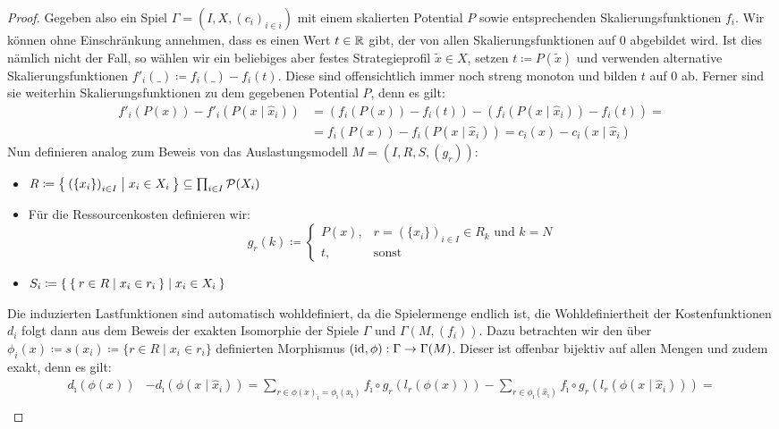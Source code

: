 \begin{proof}
	Gegeben also ein Spiel $\Gamma = (I, X, (c_i)_{i\in i})$ mit einem skalierten Potential $P$ sowie entsprechenden Skalierungsfunktionen $f_i$. Wir können ohne Einschränkung annehmen, dass es einen Wert $t \in \mathbb{R}$ gibt, der von allen Skalierungsfunktionen auf $0$ abgebildet wird. Ist dies nämlich nicht der Fall, so wählen wir ein beliebiges aber festes Strategieprofil $\widetilde{x} \in X$, setzen $t \coloneqq P(\widetilde{x})$ und verwenden alternative Skalierungsfunktionen $f'_i(\_) \coloneqq f_i(\_) - f_i(t)$. Diese sind offensichtlich immer noch streng monoton und bilden $t$ auf $0$ ab. Ferner sind sie weiterhin Skalierungsfunktionen zu dem gegebenen Potential $P$, denn es gilt:
		\begin{align*}
			f'_i(P(x)) - f'_i(P(x\mid \hat{x}_i)) 	&= \left(f_i(P(x)) - f_i(t)\right) - \left(f_i(P(x \mid \hat{x}_i)) - f_i(t)\right) = \\
													&= f_i(P(x)) - f_i(P(x\mid \hat{x}_i)) = c_i(x) - c_i(x \mid \hat{x}_i)
		\end{align*}
	Nun definieren analog zum Beweis von  das Auslastungsmodell $M = (I, R, S, (g_r))$:
	\begin{itemize}
		\item $R \coloneqq \Set{\left(\{x_i\}\right)_{i \in I} | x_i \in X_i } \subseteq \prod_{i \in I}\mathcal{P}(X_i)$
		\item Für die Ressourcenkosten definieren wir:
			\[g_r(k) \coloneqq 
				\begin{cases}
					P(x), 					&r = \left(\{x_i\}\right)_{i \in I} \in R_k 													\text{ und } k=N \\
					t,						&\text{sonst}
				\end{cases}\]
		\item $S_i \coloneqq \Set{ \Set{r \in R | x_i \in r_i} | x_i \in X_i }$
	\end{itemize}
	Die induzierten Lastfunktionen sind automatisch wohldefiniert, da die Spielermenge endlich ist, die Wohldefiniertheit der Kostenfunktionen $d_i$ folgt dann aus dem Beweis der exakten Isomorphie der Spiele $\Gamma$ und $\Gamma(M, (f_i))$. Dazu betrachten wir den über $\phi_i(x) \coloneqq s(x_i) \coloneqq \{r \in R \mid x_i \in r_i\}$ definierten Morphismus $(\mathrm{id}, \phi): \Gamma \to \Gamma(M)$. Dieser ist offenbar bijektiv auf allen Mengen und zudem exakt, denn es gilt:
	\begin{align*}
	d_{\hat{\imath}}(\phi(x)) &- d_{\hat{\imath}}(\phi(x \mid \hat{x}_i)) =\sum_{r \in \phi(x)_{\hat{\imath}} = \phi_{\hat{\imath}}(x_{\hat{\imath}})} f_{\hat{\imath}} \circ g_r(l_r(\phi(x))) - \sum_{r \in \phi_{\hat{\imath}}(\hat{x}_{\hat{\imath}})} f_{\hat{\imath}} \circ g_r(l_r(\phi(x \mid \hat{x}_i))) = \\

\end{align*}
\end{proof}
